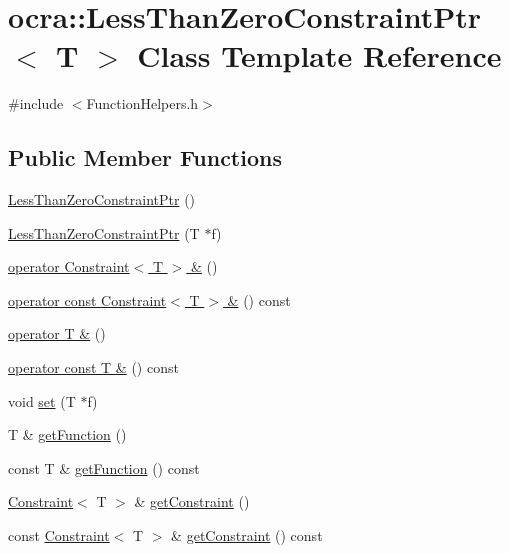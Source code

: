\hypertarget{classocra_1_1LessThanZeroConstraintPtr}{}\section{ocra\+:\+:Less\+Than\+Zero\+Constraint\+Ptr$<$ T $>$ Class Template Reference}
\label{classocra_1_1LessThanZeroConstraintPtr}


{\ttfamily \#include $<$Function\+Helpers.\+h$>$}

\subsection*{Public Member Functions}
\begin{DoxyCompactItemize}
\item 
\hyperlink{classocra_1_1LessThanZeroConstraintPtr_af07ff846216e63b3fb91f91e46d429b8}{Less\+Than\+Zero\+Constraint\+Ptr} ()
\item 
\hyperlink{classocra_1_1LessThanZeroConstraintPtr_aa8e28fec379f5aa5ee146543fecc8e9a}{Less\+Than\+Zero\+Constraint\+Ptr} (T $\ast$f)
\item 
\hyperlink{classocra_1_1LessThanZeroConstraintPtr_a028c60ee38fce1047142de48acb1dae5}{operator Constraint$<$ T $>$ \&} ()
\item 
\hyperlink{classocra_1_1LessThanZeroConstraintPtr_aaa0683c1982cc4da16c5b17ab2d678f5}{operator const Constraint$<$ T $>$ \&} () const
\item 
\hyperlink{classocra_1_1LessThanZeroConstraintPtr_a59c8bc05c7586d98607a1874ad536946}{operator T \&} ()
\item 
\hyperlink{classocra_1_1LessThanZeroConstraintPtr_a8324e8f7ff78c3eeda3a4420d36e3669}{operator const T \&} () const
\item 
void \hyperlink{classocra_1_1LessThanZeroConstraintPtr_a7f0fc4747b1648423d3664b5def67589}{set} (T $\ast$f)
\item 
T \& \hyperlink{classocra_1_1LessThanZeroConstraintPtr_aa2b223f5891963f1b8be99e4408de9f2}{get\+Function} ()
\item 
const T \& \hyperlink{classocra_1_1LessThanZeroConstraintPtr_a9b701f6f119d430e6717232fa6a080d4}{get\+Function} () const
\item 
\hyperlink{classocra_1_1Constraint}{Constraint}$<$ T $>$ \& \hyperlink{classocra_1_1LessThanZeroConstraintPtr_aa0d2d38bfa583d77e6b59c683978f3be}{get\+Constraint} ()
\item 
const \hyperlink{classocra_1_1Constraint}{Constraint}$<$ T $>$ \& \hyperlink{classocra_1_1LessThanZeroConstraintPtr_a102482553bd9c85728de1e860903cc16}{get\+Constraint} () const
\end{DoxyCompactItemize}


